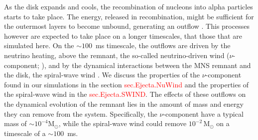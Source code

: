 \documentclass[11pt,a4paper,headinclude=true,DIV=14,BCOR=8mm,chapterprefix,listof=totoc,twoside,openright,abstracton]{scrbook}
\def\Msun{{\text{M}_{\odot}}}
\newcommand{\red}[1]{\textcolor{red}{#1}}
\newcommand{\swind}{spiral-wave wind}
\newcommand{\nwind}{$\nu$-component}
\begin{document}
As the disk expands and cools, the recombination of nucleons into 
alpha particles starts to take place.
The energy, released in recombination, might be sufficient for the outermost 
layers to become unbound, generating an outflow 
\citep{Beloborodov:2008nx,Lee:2009uc,Fernandez:2013tya}.
This processes however are expected to take place on a longer timescales,
that those that are simulated here.
On the $\sim100$~ms timescale, the outflows are driven by the neutrino heating, 
above the remnant, the so-called neutrino-driven wind 
(\nwind; \citealt{Dessart:2008zd,Perego:2014fma,Just:2014fka}),
and by the dynamical interactions between the \ac{MNS} 
remnant and the disk, the \swind{} \citep{Nedora:2019jhl}.
We discuss the properties of the \nwind{} found in our simulations
in the section \red{sec.Ejecta.NuWind} and the properties of the 
\swind{} in the \red{sec.Ejecta.SWIND}.
The effects of these outflows on the dynamical evolution of the remnant 
lies in the amount of mass and energy they can remove from the system.
Specifically, the \nwind{} have a typical mass of ${\sim} 10^{-4}\Msun$, 
while the \swind{} could remove $10^{-2}\,\Msun$ on a timescale of a $\sim100$~ms.
\end{document}
